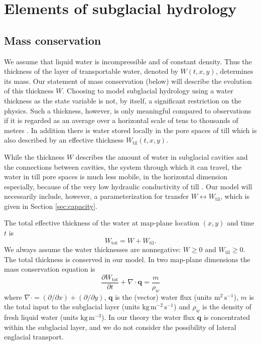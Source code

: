 \documentclass[11pt,final]{amsart}
\newcommand\bq{\mathbf{q}}
\newcommand{\Div}{\nabla\cdot}
\newcommand{\Wtil}{W_{\text{til}}}
\newcommand{\Wtot}{W_{\text{tot}}}
\begin{document}
\section{Elements of subglacial hydrology} \label{sec:elements}

\subsection*{Mass conservation}  We assume that liquid water is incompressible and of constant density.  Thus the thickness of the layer of transportable water, denoted by $W(t,x,y)$, determines its mass.  Our statement of mass conservation (below) will describe the evolution of this thickness $W$.  Choosing to model subglacial hydrology using a water thickness as the state variable is not, by itself, a significant restriction on the physics.  Such a thickness, however, is only meaningful compared to observations if it is regarded as an average over a horizontal scale of tens to thousands of meters \citep{FlowersClarke2002_theory}.  In addition there is water stored locally in the pore spaces of till \citep{Tulaczyketal2000b} which is also described by an effective thickness $\Wtil(t,x,y)$.  

While the thickness $W$ describes the amount of water in subglacial cavities and the connections between cavities, the system through which it can travel, the water in till pore spaces is much less mobile, in the horizontal dimension especially, because of the very low hydraulic conductivity of till \citep{TrufferEchelmeyerHarrison2001,Tulaczyketal2000}.  Our model will necessarily include, however, a parameterization for transfer $W \leftrightarrow \Wtil$, which is given in Section \ref{sec:capacity}.

The total effective thickness of the water at map-plane location $(x,y)$ and time $t$ is
\begin{equation}
\Wtot = W + \Wtil.  \label{eq:totalwater}
\end{equation}
We always assume the water thicknesses are nonnegative: $W \ge 0$ and $\Wtil \ge 0$.  The total thickness is conserved in our model.  In two map-plane dimensions the mass conservation equation is \citep{Clarke05}
\begin{equation} \label{eq:conserve}
\frac{\partial \Wtot}{\partial t} + \Div \bq = \frac{m}{\rho_w}
\end{equation}
where $\Div = (\partial/\partial x) + (\partial/\partial y)$, $\bq$ is the (vector) water flux (units $\text{m}^2\,\text{s}^{-1}$), $m$ is the total input to the subglacial layer (units $\text{kg}\,\text{m}^{-2}\,\text{s}^{-1}$) and $\rho_w$ is the density of fresh liquid water (units $\text{kg}\,\text{m}^{-3}$).  In our theory the water flux $\bq$ is concentrated within the subglacial layer, and we do not consider the possibility of lateral englacial transport.
\end{document}
